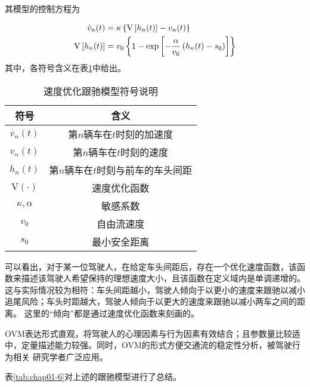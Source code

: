 其模型的控制方程为

\begin{align}
  \dot{v}_n(t) &= \kappa \left\{ \mathrm{V} \left[ h_n(t) \right] - v_n(t) \right\} \notag \\
  \mathrm{V} \left[ h_n(t) \right] &= v_0 \left\{ 1 - \exp \left[ - \frac{\alpha}{v_0}\left(h_n(t)-s_0\right) \right] \right\}
  \label{eq:chap01-4}
\end{align}
其中，各符号含义在表\ref{tab:chap01-5}中给出。

\begin{table}
  \centering
  \caption{速度优化跟驰模型符号说明}
  \begin{tabular}{cc}
    \toprule
    符号          &  含义                         \\
    \midrule
    $\dot{v_n}(t)$    & 第$n$辆车在$t$时刻的加速度        \\
    $v_n(t)$          & 第$n$辆车在$t$时刻的速度         \\
    $h_n(t)$          & 第$n$辆车在$t$时刻与前车的车头间距  \\
    $\mathrm{V}(\cdot)$        & 速度优化函数         \\
    $\kappa, \alpha$  & 敏感系数             \\
    $v_0$             & 自由流速度           \\
    $s_0$             & 最小安全距离        \\
    \bottomrule
  \end{tabular}
  \label{tab:chap01-5}
\end{table}

可以看出，对于某一位驾驶人，在给定车头间距后，存在一个优化速度函数，该函数来描述该驾驶人希望保持的理想速度大小，且该函数在定义域内是单调递增的。
这与实际情况较为相符：车头间距越小，驾驶人倾向于以更小的速度来跟驰以减小追尾风险；车头时距越大，驾驶人倾向于以更大的速度来跟驰以减小两车之间的距离。
这里的“倾向”都是通过速度优化函数来刻画的。

OVM表达形式直观，将驾驶人的心理因素与行为因素有效结合；且参数量比较适中，定量描述能力较强。同时，OVM的形式方便交通流的稳定性分析，被驾驶行为相关
研究学者广泛应用。

表\ref{tab:chap01-6}对上述的跟驰模型进行了总结。

